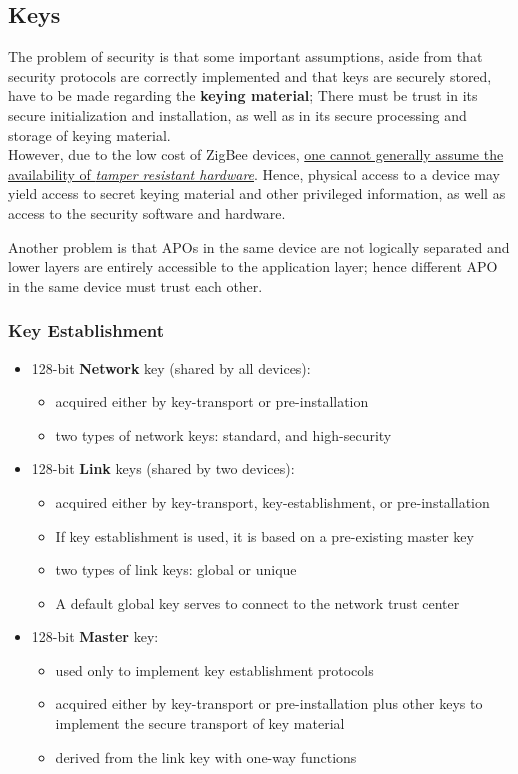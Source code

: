 \subsection{Keys}
The problem of security is that some important assumptions, aside from that security protocols are correctly implemented and that keys are securely stored, have to be made regarding the \textbf{keying material};
There must be trust in its secure initialization and installation, as well as in its secure processing and storage of keying material.\\
However, due to the low cost of ZigBee devices, \ul{one cannot generally assume the availability of \textit{tamper resistant hardware}}.
Hence, physical access to a device may yield access to secret keying
material and other privileged information, as well as access to the
security software and hardware.

Another problem is that APOs in the same device are not logically separated and lower layers are entirely accessible to the application layer; hence different APO in the same device must trust each other.

\subsubsection{Key Establishment}
\begin{itemize}
   \item 128-bit \textbf{Network} key (shared by all devices):
   \begin{itemize}
      \item acquired either by key-transport or pre-installation
      \item two types of network keys: standard, and high-security
   \end{itemize}
   \item 128-bit \textbf{Link} keys (shared by two devices):
   \begin{itemize}
      \item acquired either by key-transport, key-establishment, or pre-installation
      \item If key establishment is used, it is based on a pre-existing master key
      \item two types of link keys: global or unique
      \item A default global key serves to connect to the network trust center
   \end{itemize}
   \item 128-bit \textbf{Master} key:
   \begin{itemize}
      \item used only to implement key establishment protocols
      \item acquired either by key-transport or pre-installation
      plus other keys to implement the secure transport of key material
      \item derived from the link key with one-way functions
   \end{itemize}
\end{itemize}

